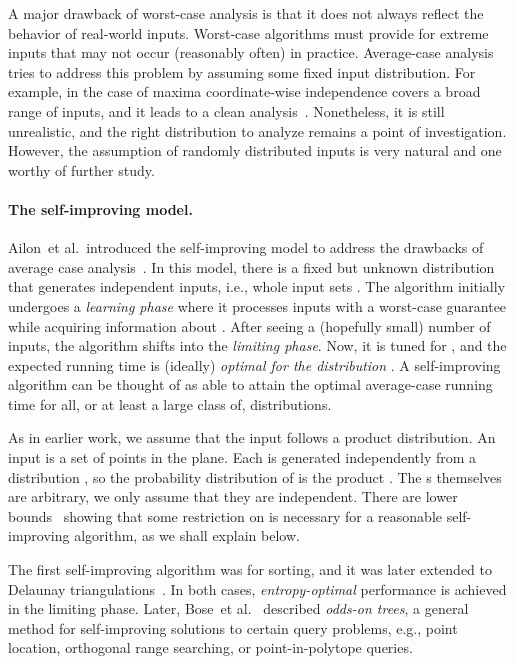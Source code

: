 \documentclass[letterpaper,11pt]{article}
\newcommand{\etal}{et al.}
\begin{document}
A major drawback of worst-case analysis
is that it does not always reflect the behavior
of real-world inputs. Worst-case algorithms 
must provide for extreme inputs that 
may not occur (reasonably often) in 
practice. Average-case analysis tries 
to address this problem by assuming some 
fixed input distribution. For example, in the 
case of maxima 
coordinate-wise independence covers a broad
range of inputs, and it leads to a clean 
analysis~\cite{Buchta89}. Nonetheless, it is still
unrealistic, and the right 
distribution to analyze remains a point of 
investigation. However, the assumption of 
randomly distributed inputs is very natural 
and one worthy of further study.

\paragraph{The self-improving model.} 
Ailon~\etal~introduced the self-improving 
model to address the drawbacks of average 
case analysis~\cite{ACCL}. 
In this model, there is a fixed but 
unknown distribution  that 
generates independent inputs, i.e., whole 
input sets . The algorithm initially
undergoes a \emph{learning phase} where 
it processes inputs with a worst-case
guarantee while acquiring information 
about . 
After seeing a (hopefully small) 
number of inputs, the algorithm shifts
into the \emph{limiting phase}. Now, it 
is tuned for , and the expected 
running time is (ideally) \emph{optimal 
for the distribution }. 
A self-improving algorithm 
can be thought of as able to attain 
the optimal average-case
running time for all, or at least 
a large class of, distributions. 

As in earlier work, 
we assume that the input follows a product 
distribution. An input 
is a set of  points in the plane. Each 
 is generated independently from a 
distribution , so the probability 
distribution of  is the product 
. The s themselves
are arbitrary, we only assume that they 
are independent. There are lower 
bounds~\cite{AilonCCLMS11} showing that 
some restriction on  is
necessary for a reasonable self-improving 
algorithm, as we shall explain below.

The first self-improving algorithm was 
for sorting, and it was later extended 
to Delaunay 
triangulations~\cite{CS_self_improve,AilonCCLMS11}.
In both cases, \emph{entropy-optimal} 
performance is achieved in the limiting phase.
Later, Bose~\etal~\cite{BoseDeDoDuKiMo10} 
described \emph{odds-on trees}, a general 
method for self-improving solutions to
certain query problems, e.g., 
point location, orthogonal range searching, 
or point-in-polytope queries.
\end{document}
